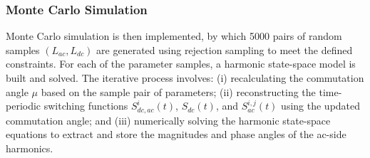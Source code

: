 
\subsubsection{Monte Carlo Simulation}
Monte Carlo simulation is then implemented, by which 5000 pairs of random samples $(L_{ac}, L_{dc})$ are generated using rejection sampling to meet the defined constraints. For each of the parameter samples, a harmonic state-space model is built and solved. The iterative process involves: (i) recalculating the commutation angle $\mathsf{\mu}$ based on the sample pair of parameters; (ii) reconstructing the time-periodic switching functions $S_{dc,ac}^{i}(t)$, $S_{dc}(t)$, and $S_{ac}^{i,j}(t)$ using the updated commutation angle; and (iii) numerically solving the harmonic state-space equations to extract and store the magnitudes and phase angles of the ac-side harmonics.

